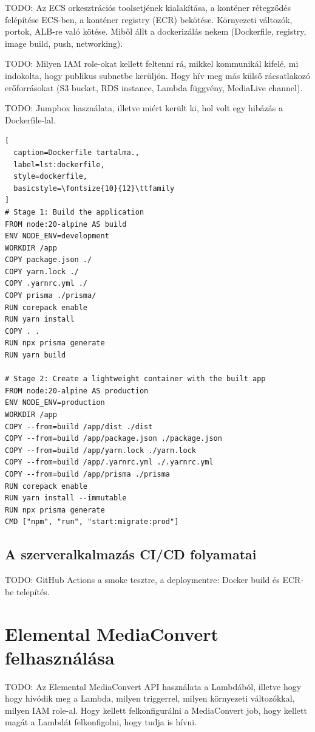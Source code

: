 TODO: Az ECS orkesztrációs toolsetjének kialakítása, a konténer rétegződés felépítése ECS-ben, a konténer registry (ECR) bekötése. Környezeti változók, portok, ALB-re való kötése. Miből állt a dockerizálás nekem (Dockerfile, registry, image build, push, networking).

TODO: Milyen IAM role-okat kellett feltenni rá, mikkel kommunikál kifelé, mi indokolta, hogy publikus subnetbe kerüljön. Hogy hív meg más külső rácsatlakozó erőforrásokat (S3 bucket, RDS instance, Lambda függvény, MediaLive channel).

TODO: Jumpbox használata, illetve miért került ki, hol volt egy hibázás a Dockerfile-lal.

\begin{minipage}{0.92\textwidth}
  \begin{lstlisting}[
  caption=Dockerfile tartalma.,
  label=lst:dockerfile,
  style=dockerfile,
  basicstyle=\fontsize{10}{12}\ttfamily
]
# Stage 1: Build the application
FROM node:20-alpine AS build
ENV NODE_ENV=development
WORKDIR /app
COPY package.json ./
COPY yarn.lock ./
COPY .yarnrc.yml ./
COPY prisma ./prisma/
RUN corepack enable
RUN yarn install
COPY . .
RUN npx prisma generate
RUN yarn build

# Stage 2: Create a lightweight container with the built app
FROM node:20-alpine AS production
ENV NODE_ENV=production
WORKDIR /app
COPY --from=build /app/dist ./dist
COPY --from=build /app/package.json ./package.json
COPY --from=build /app/yarn.lock ./yarn.lock
COPY --from=build /app/.yarnrc.yml ./.yarnrc.yml
COPY --from=build /app/prisma ./prisma
RUN corepack enable
RUN yarn install --immutable
RUN npx prisma generate
CMD ["npm", "run", "start:migrate:prod"]
\end{lstlisting}
\end{minipage}

\subsection{A szerveralkalmazás CI/CD folyamatai}

TODO: GitHub Actions a smoke tesztre, a deploymentre: Docker build és ECR-be telepítés.

\section{Elemental MediaConvert felhasználása}

TODO: Az Elemental MediaConvert API használata a Lambdából, illetve hogy hogy hívódik meg a Lambda, milyen triggerrel, milyen környezeti változókkal, milyen IAM role-al. Hogy kellett felkonfigurálni a MediaConvert job, hogy kellett magát a Lambdát felkonfigolni, hogy tudja is hívni.
